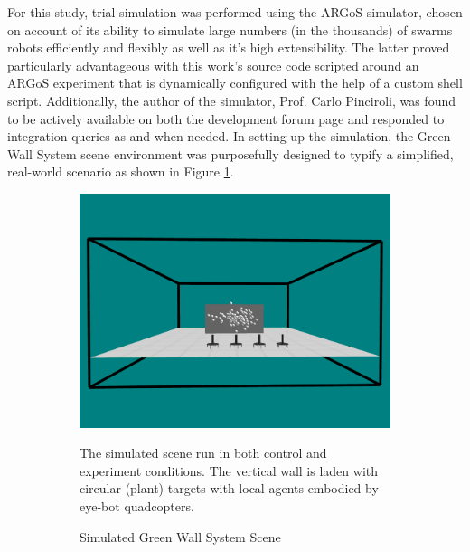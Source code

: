 \documentclass{report}
\begin{document}
For this study, trial simulation was performed using the ARGoS simulator, chosen on account of its ability to simulate large numbers (in the thousands) of swarms robots efficiently and flexibly \cite{Pinciroli2014} as well as it's high extensibility. The latter proved particularly advantageous with this work's source code scripted around an ARGoS experiment that is dynamically configured with the help of a custom shell script. Additionally, the author of the simulator, Prof. Carlo Pinciroli, was found to be actively available on both the development forum page and responded to integration queries as and when needed. In setting up the simulation, the Green Wall System scene environment was purposefully designed to typify a simplified, real-world scenario as shown in Figure \ref{fig:sim_orig_scene}.

\begin{figure}
	\begin{subfigure}{0.6\textwidth}
		\centering
		\includegraphics[width=\textwidth]{images/vertical_wall_garden_scene}
		\caption{Simulated Green Wall System Scene}
		\label{fig:sim_orig_scene}
		{The simulated scene run in both control and experiment conditions. The vertical wall is laden with circular (plant) targets with local agents embodied by eye-bot quadcopters}.
	\end{subfigure}
	~
	\begin{subfigure}{0.4\textwidth}
		\centering

\end{subfigure}
\end{figure}
\end{document}
